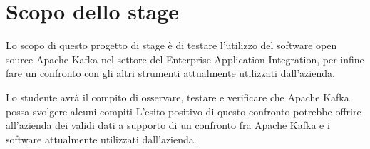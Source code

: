\section*{Scopo dello stage}
Lo scopo di questo progetto di stage è di testare l'utilizzo del software open source Apache Kafka nel settore del Enterprise Application Integration, per infine fare un confronto con gli altri strumenti attualmente utilizzati dall'azienda.

Lo studente avrà il compito di osservare, testare e verificare che Apache Kafka possa svolgere alcuni compiti
L'esito positivo di questo confronto potrebbe offrire all'azienda dei validi dati a supporto di un confronto fra Apache Kafka e i software attualmente utilizzati dall'azienda.
